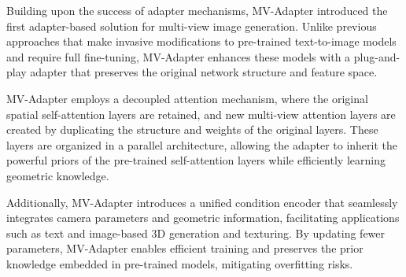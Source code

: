 Building upon the success of adapter mechanisms, MV-Adapter
\cite{mvadapter} introduced the first adapter-based solution for
multi-view image generation. Unlike previous approaches that make
invasive modifications to pre-trained text-to-image models and
require full fine-tuning, MV-Adapter enhances these models with a
plug-and-play adapter that preserves the original network structure
and feature space.

MV-Adapter employs a decoupled attention mechanism, where the
original spatial self-attention layers are retained, and new
multi-view attention layers are created by duplicating the structure
and weights of the original layers. These layers are organized in a
parallel architecture, allowing the adapter to inherit the powerful
priors of the pre-trained self-attention layers while efficiently
learning geometric knowledge.

Additionally, MV-Adapter introduces a unified condition encoder that
seamlessly integrates camera parameters and geometric information,
facilitating applications such as text and image-based 3D generation
and texturing. By updating fewer parameters, MV-Adapter enables
efficient training and preserves the prior knowledge embedded in
pre-trained models, mitigating overfitting risks.
